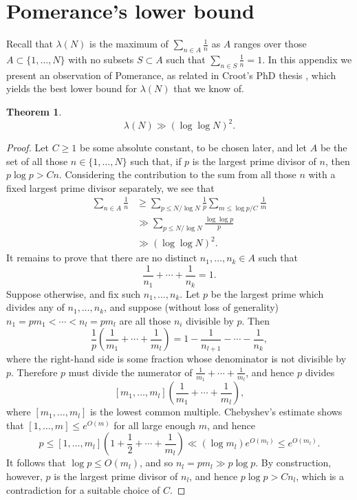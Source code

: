 \documentclass{amsart}
\newcommand{\brac}[1]{\left( #1\right)}
\newtheorem{theorem}{Theorem}
\begin{document}
\appendix

\section{Pomerance's lower bound}

Recall that $\lambda(N)$ is the maximum of $\sum_{n\in A}\frac{1}{n}$ as $A$ ranges over those $A\subset \{1,\ldots,N\}$ with no subsets $S\subset A$ such that $\sum_{n\in S}\frac{1}{n}=1$. In this appendix we present an observation of Pomerance, as related in Croot's PhD thesis \cite{Crootphd}, which yields the best lower bound for $\lambda(N)$ that we know of.

\begin{theorem}
\[\lambda(N) \gg (\log\log N)^2.\]
\end{theorem}
\begin{proof}
Let $C\geq 1$ be some absolute constant, to be chosen later, and let $A$ be the set of all those $n\in \{1,\ldots,N\}$ such that, if $p$ is the largest prime divisor of $n$, then $p\log p> Cn$. Considering the contribution to the sum from all those $n$ with a fixed largest prime divisor separately, we see that 
\begin{align*}
\sum_{n\in A}\frac{1}{n}
&\geq \sum_{p\leq N/\log N}\frac{1}{p}\sum_{m\leq \log p/C}\frac{1}{m}\\
&\gg \sum_{p\leq N/\log N}\frac{\log\log p}{p}\\
&\gg (\log\log N)^2.
\end{align*}
It remains to prove that there are no distinct $n_1,\ldots,n_k\in A$ such that 
\[\frac{1}{n_1}+\cdots+\frac{1}{n_k}=1.\]
Suppose otherwise, and fix such $n_1,\ldots,n_k$. Let $p$ be the largest prime which divides any of $n_1,\ldots,n_k$, and suppose (without loss of generality) $n_1=pm_1<\cdots<n_l=pm_l$ are all those $n_i$ divisible by $p$. Then
\[\frac{1}{p}\brac{\frac{1}{m_1}+\cdots+\frac{1}{m_l}}=1-\frac{1}{n_{l+1}}-\cdots-\frac{1}{n_k},\]
where the right-hand side is some fraction whose denominator is not divisible by $p$. Therefore $p$ must divide the numerator of $\frac{1}{m_1}+\cdots+\frac{1}{m_l}$, and hence $p$ divides
\[[m_1,\ldots,m_l]\brac{\frac{1}{m_1}+\cdots+\frac{1}{m_l}},\]
where $[m_1,\ldots,m_l]$ is the lowest common multiple. Chebyshev's estimate shows that $[1,\ldots,m]\leq e^{O(m)}$ for all large enough $m$, and hence
\[p\leq [1,\ldots,m_l]\brac{1+\frac{1}{2}+\cdots+\frac{1}{m_l}}\ll (\log m_l) e^{O(m_l)}\leq e^{O(m_l)}.\]
It follows that $\log p\leq O(m_l)$, and so $n_l=pm_l\gg p\log p$. By construction, however, $p$ is the largest prime divisor of $n_l$, and hence $p\log p>Cn_l$, which is a contradiction for a suitable choice of $C$.
\end{proof}
\end{document}

